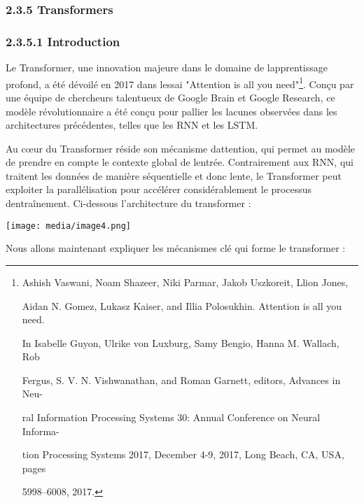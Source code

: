 \documentclass[
]{article}
\begin{document}
\subsubsection{}\label{section-12}

\subsubsection{2.3.5 Transformers}\label{transformers}

\subsubsection{2.3.5.1 Introduction}\label{introduction-4}

Le Transformer, une innovation majeure dans le domaine de
l\textquotesingle apprentissage profond, a été dévoilé en 2017 dans
l\textquotesingle essai "Attention is all you need"\footnote{Ashish
  Vaswani, Noam Shazeer, Niki Parmar, Jakob Uszkoreit, Llion Jones,

  Aidan N. Gomez, Lukasz Kaiser, and Illia Polosukhin. Attention is all
  you need.

  In Isabelle Guyon, Ulrike von Luxburg, Samy Bengio, Hanna M. Wallach,
  Rob

  Fergus, S. V. N. Vishwanathan, and Roman Garnett, editors, Advances in
  Neu-

  ral Information Processing Systems 30: Annual Conference on Neural
  Informa-

  tion Processing Systems 2017, December 4-9, 2017, Long Beach, CA, USA,
  pages

  5998--6008, 2017.}. Conçu par une équipe de chercheurs talentueux de
Google Brain et Google Research, ce modèle révolutionnaire a été conçu
pour pallier les lacunes observées dans les architectures précédentes,
telles que les RNN et les LSTM.

Au cœur du Transformer réside son mécanisme d\textquotesingle attention,
qui permet au modèle de prendre en compte le contexte global de
l\textquotesingle entrée. Contrairement aux RNN, qui traitent les
données de manière séquentielle et donc lente, le Transformer peut
exploiter la parallélisation pour accélérer considérablement le
processus d\textquotesingle entraînement. Ci-dessous l'architecture du
transformer :

\texttt{[image: media/image4.png]}

Nous allons maintenant expliquer les mécanismes clé qui forme le
transformer :
\end{document}
